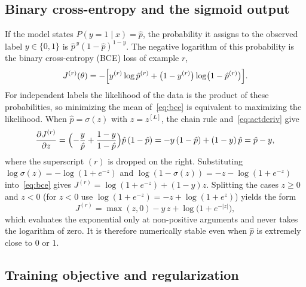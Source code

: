 \subsection{Binary cross-entropy and the sigmoid output}
\label{sec:prelim-bce}

If the model states $P(y=1\mid x)=\hat p$, the probability it assigns to the observed label $y\in\{0,1\}$ is $\hat p^{\,y}(1-\hat p)^{1-y}$. The negative logarithm of this probability is the binary cross-entropy (BCE) loss of example $r$,
\begin{equation}
  J^{(r)}(\theta)=-\Bigl[y^{(r)}\log\hat p^{(r)}+\bigl(1-y^{(r)}\bigr)\log\bigl(1-\hat p^{(r)}\bigr)\Bigr].
  \label{eq:bce}
\end{equation}
For independent labels the likelihood of the data is the product of these probabilities, so minimizing the mean of~\eqref{eq:bce} is equivalent to maximizing the likelihood. When $\hat p=\sigma(z)$ with $z=z^{[L]}$, the chain rule and~\eqref{eq:actderiv} give
\begin{equation}
  \frac{\partial J^{(r)}}{\partial z}
  =\Bigl(-\frac{y}{\hat p}+\frac{1-y}{1-\hat p}\Bigr)\hat p\,(1-\hat p)
  =-y\,(1-\hat p)+(1-y)\,\hat p
  =\hat p-y,
  \label{eq:sigbce}
\end{equation}
where the superscript $(r)$ is dropped on the right. Substituting $\log\sigma(z)=-\log(1+e^{-z})$ and $\log(1-\sigma(z))=-z-\log(1+e^{-z})$ into~\eqref{eq:bce} gives $J^{(r)}=\log(1+e^{-z})+(1-y)z$. Splitting the cases $z\ge 0$ and $z<0$ (for $z<0$ use $\log(1+e^{-z})=-z+\log(1+e^{z})$) yields the form
\begin{equation}
  J^{(r)}=\max(z,0)-y\,z+\log\bigl(1+e^{-|z|}\bigr),
  \label{eq:stablebce}
\end{equation}
which evaluates the exponential only at non-positive arguments and never takes the logarithm of zero. It is therefore numerically stable even when $\hat p$ is extremely close to $0$ or $1$.

\subsection{Training objective and regularization}
\label{sec:prelim-reg}

